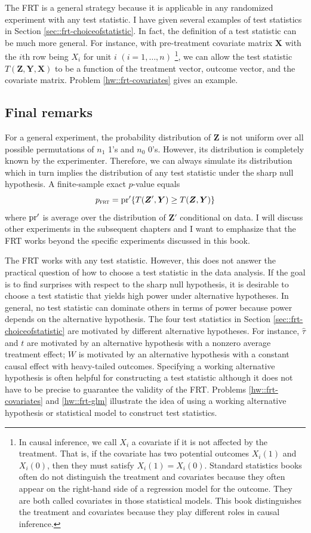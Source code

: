 The FRT is a general strategy because it is applicable in any randomized experiment with any test statistic. 
I have given several examples of test statistics in Section \ref{sec::frt-choiceofstatistic}. In fact, the definition of a test statistic can be much more general. For instance, with pre-treatment covariate matrix $\bm{X}$ with the $i$th row being $X_i$ for unit $i$ $(i = 1, \ldots, n)$ \footnote{In causal inference, we call $X_i$ a covariate if it is not affected by the treatment. That is, if the covariate has two potential outcomes $X_i(1)$ and $X_i(0)$, then they must satisfy $X_i(1) = X_i(0)$. Standard statistics books often do not distinguish the treatment and covariates because they often appear on the right-hand side of a regression model for the outcome. They are both called covariates in those statistical models. This book distinguishes the treatment and covariates because they play different roles in causal inference. }, we can allow the test statistic $T(\bm{Z}, \bm{Y}, \bm{X})$ to be a function of the treatment vector, outcome vector, and the covariate matrix.  Problem \ref{hw::frt-covariates} gives an example. 



\subsection{Final remarks}
For a general experiment, the probability distribution of $\bm{Z}$ is not uniform over all possible permutations of $n_1$ 1's and $n_0$ 0's. However, its distribution is completely known by the experimenter. Therefore, we can always simulate its distribution which in turn implies the distribution of any test statistic under the sharp null hypothesis. A finite-sample exact $p$-value equals 
$$
p_\textsc{frt} = \textup{pr}'\{  T(\bm{Z}', \bm{Y}) \geq T(\bm{Z}, \bm{Y}) \}
$$ 
where $\textup{pr}'$ is average over the distribution of $\bm{Z}'$ conditional on data. I will discuss other experiments in the subsequent chapters and I want to emphasize that the FRT works beyond the specific experiments discussed in this book. 

 
The FRT works with any test statistic. However, this does not answer the practical question of how to choose a test statistic in the data analysis. If the goal is to find surprises with respect to the sharp null hypothesis, it is desirable to choose a test statistic that yields high power under alternative hypotheses. In general, no test statistic can dominate others in terms of power because power depends on the alternative hypothesis. The four test statistics in Section \ref{sec::frt-choiceofstatistic} are motivated by different alternative hypotheses. For instance, $\hat{\tau}$ and $t$ are motivated by an alternative hypothesis with a nonzero average treatment effect; $W$ is motivated by an alternative hypothesis with a constant causal effect with heavy-tailed outcomes. Specifying a working alternative hypothesis is often helpful for constructing a test statistic although it does not have to be precise to guarantee the validity of the FRT. Problems \ref{hw::frt-covariates} and \ref{hw::frt-glm} illustrate the idea of using a working alternative hypothesis or statistical model to construct test statistics. 
 



